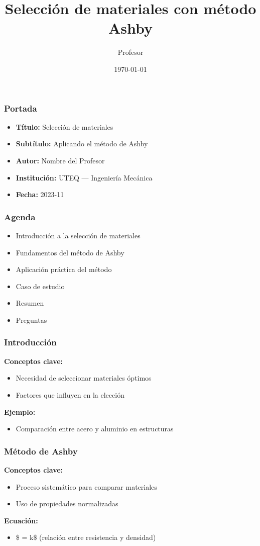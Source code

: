 \documentclass[aspectratio=169]{beamer}
\title{Selección de materiales con método Ashby}
\author{Profesor}
\institute{UTEQ}
\date{\today}
\begin{document}
\begin{frame}
  \titlepage
\end{frame}

\begin{frame}{\frametitle{Portada}}
  \begin{itemize}
    \item \textbf{Título:} Selección de materiales
    \item \textbf{Subtítulo:} Aplicando el método de Ashby
    \item \textbf{Autor:} Nombre del Profesor
    \item \textbf{Institución:} UTEQ — Ingeniería Mecánica
    \item \textbf{Fecha:} 2023-11
  \end{itemize}
\end{frame}

\begin{frame}{\frametitle{Agenda}}
  \begin{itemize}
    \item Introducción a la selección de materiales
    \item Fundamentos del método de Ashby
    \item Aplicación práctica del método
    \item Caso de estudio
    \item Resumen
    \item Preguntas
  \end{itemize}
\end{frame}

\begin{frame}{\frametitle{Introducción}}
  \medskip\textbf{Conceptos clave:}
  \begin{itemize}
    \item Necesidad de seleccionar materiales óptimos
    \item Factores que influyen en la elección
  \end{itemize}
  \medskip\textbf{Ejemplo:}
  \begin{itemize}
    \item Comparación entre acero y aluminio en estructuras
  \end{itemize}
\end{frame}

\begin{frame}{\frametitle{Método de Ashby}}
  \medskip\textbf{Conceptos clave:}
  \begin{itemize}
    \item Proceso sistemático para comparar materiales
    \item Uso de propiedades normalizadas
  \end{itemize}
  \medskip\textbf{Ecuación:}
  \begin{itemize}
    \item \$\frac{\sigma}{\rho} = k\$ (relación entre resistencia y densidad)
  \end{itemize}
\end{frame}
\end{document}

